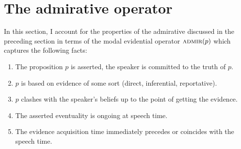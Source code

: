 \documentclass[output=paper]{langscibook}
\begin{document}
\section{The admirative operator}\label{sec:admirative-analysis}\largerpage

In this section, I account for the properties of the  admirative discussed in the preceding section in terms of the modal evidential operator $\textsc{admir}(p)$ which captures the following facts:

\begin{enumerate}
\item The proposition $p$ is asserted, the speaker is committed to the truth of $p$.
\item $p$ is based on evidence of some sort (direct, inferential, reportative).
\item $p$ clashes with the speaker's beliefs up to the point of getting the evidence.
\item The asserted eventuality is ongoing at speech time.
\item The evidence acquisition time immediately precedes or coincides with the speech time. %
\end{enumerate}
\end{document}

